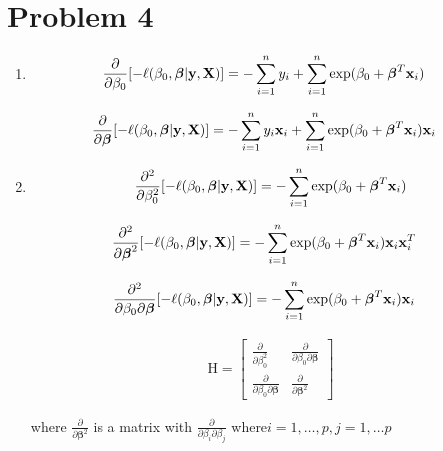 \documentclass{article}
\newcommand{\vect}[1]{\boldsymbol{#1}}
\newcommand{\vectrm}[1]{\boldsymbol{\rm #1}}
\begin{document}
\section*{Problem 4}
\begin{enumerate}[label=(\alph*)]
\item 
\begin{align*}
\frac{\partial}{\partial \beta_0}[ -\ell(\beta_0, \vect{\beta}| \vectrm{y}, \vectrm{X}) ]&= -\sum_{i=1}^{n} y_i + \sum_{i=1}^{n}\exp(\beta_0 + \vect{\beta}^T \vectrm{x}_i) 
\end{align*}

\begin{align*}
\frac{\partial}{\partial \vect{\beta}}[ -\ell(\beta_0, \vect{\beta}| \vectrm{y}, \vectrm{X}) ]&= -\sum_{i=1}^{n} y_i \vectrm{x}_i + \sum_{i=1}^{n}\exp(\beta_0 + \vect{\beta}^T \vectrm{x}_i) \vectrm{x}_i
\end{align*}

\item
\begin{align*}
\frac{\partial^2}{\partial \beta_0^2}[ -\ell(\beta_0, \vect{\beta}| \vectrm{y}, \vectrm{X}) ]&= -\sum_{i=1}^{n}\exp(\beta_0 + \vect{\beta}^T \vectrm{x}_i) \\
\end{align*}

\begin{align*}
\frac{\partial^2}{\partial \vect{\beta}^2}[ -\ell(\beta_0, \vect{\beta}| \vectrm{y}, \vectrm{X}) ]&= -\sum_{i=1}^{n}\exp(\beta_0 + \vect{\beta}^T \vectrm{x}_i) \vectrm{x}_i \vectrm{x}_i^T
\end{align*}

\begin{align*}
\frac{\partial^2}{\partial \beta_0 \partial \vect{\beta}}[ -\ell(\beta_0, \vect{\beta}| \vectrm{y}, \vectrm{X}) ]&= -\sum_{i=1}^{n}\exp(\beta_0 + \vect{\beta}^T \vectrm{x}_i) \vectrm{x}_i
\end{align*}

\begin{align*}
\mathrm{H} = \begin{bmatrix}
    \frac{\partial}{\partial \beta_0^2} & \frac{\partial}{\partial \beta_0 \partial \vect{\beta}} \\
    \frac{\partial}{\partial \beta_0 \partial \vect{\beta}} & \frac{\partial}{\partial \vect{\beta}^2}
\end{bmatrix}
\end{align*}

where \(\frac{\partial}{\partial \vect{\beta}^2}\) is a matrix with \(\frac{\partial}{\partial \beta_i \partial \beta_j}\) where\(i = 1,\ldots, p, j = 1,\ldots p\)


\end{enumerate}
\end{document}
